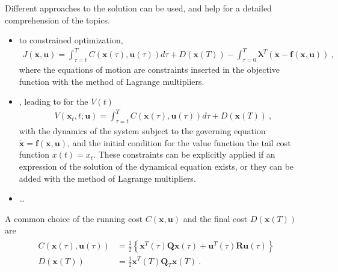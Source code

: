 \documentclass[letterpaper,10pt,english]{jupyterBook}
\begin{document}
\sphinxAtStartPar
Different approaches to the solution can be used, and help for a detailed comprehension of the topics.
\begin{itemize}
\item {} 
\sphinxAtStartPar
{} to constrained optimization,
\begin{equation*}
\begin{split}J(\mathbf{x},\mathbf{u}) = \int_{\tau=t}^{T} C(\mathbf{x}(\tau), \mathbf{u}(\tau)) d \tau +  D(\mathbf{x}(T)) - \int_{\tau=0}^{T} \boldsymbol\lambda^T \left( \dot{\mathbf{x}} - \mathbf{f}(\mathbf{x},\mathbf{u}) \right) \ ,\end{split}
\end{equation*}
\sphinxAtStartPar
where the equations of motion are constraints inserted in the objective function with the method of Lagrange multipliers.

\item {} 
\sphinxAtStartPar
{}, leading to  for the  \(V(t)\)
\begin{equation*}
\begin{split}V(\mathbf{x}_t, t; \mathbf{u}) = \int_{\tau=t}^{T} C(\mathbf{x}(\tau), \mathbf{u}(\tau)) d \tau +  D(\mathbf{x}(T)) \ ,\end{split}
\end{equation*}
\sphinxAtStartPar
with the dynamics of the system subject to the governing equation \(\dot{\mathbf{x}} = \mathbf{f}(\mathbf{x},\mathbf{u})\), and  the initial condition for the value function \sphinxhyphen{} the tail cost function \sphinxhyphen{} \(x(t) = x_t\). These constraints can be explicitly applied if an expression of the solution of the dynamical equation exists, or they can be added with the method of Lagrange multipliers.

\item {} 
\sphinxAtStartPar
…

\end{itemize}

\sphinxAtStartPar
A common choice of the running cost \(C(\mathbf{x},\mathbf{u})\) and the final cost \(D(\mathbf{x}(T))\) are
\begin{equation*}
\begin{split}\begin{aligned}
C(\mathbf{x}(\tau),\mathbf{u}(\tau)) & = \frac{1}{2}\left\{ \mathbf{x}^T(\tau) \mathbf{Q} \mathbf{x}(\tau) + \mathbf{u}^T(\tau) \mathbf{R} \mathbf{u}(\tau)  \right\} \\
D(\mathbf{x}(T)) & = \frac{1}{2} \mathbf{x}^T(T) \mathbf{Q}_T \mathbf{x}(T)  \ .
\end{aligned}\end{split}
\end{equation*}
\sphinxAtStartPar
{}
\end{document}
